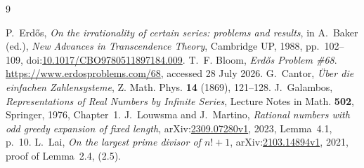 \documentclass[11pt]{article}
\begin{document}
\begin{thebibliography}{9}
\small
\raggedright
\setlength{\itemsep}{0pt}
 P.~Erd\H{o}s, \emph{On the irrationality of certain series:
  problems and results}, in A.~Baker (ed.), \emph{New Advances in Transcendence
  Theory}, Cambridge UP, 1988, pp.~102--109,
  doi:\href{https://doi.org/10.1017/CBO9780511897184.009}
  {10.1017/CBO9780511897184.009}.
 T.~F. Bloom, \emph{Erd\H{o}s Problem \#68}.
  \url{https://www.erdosproblems.com/68}, accessed 28 July 2026.
 G.~Cantor, \emph{\"Uber die einfachen Zahlensysteme},
  Z. Math. Phys. \textbf{14} (1869), 121--128.
 J.~Galambos, \emph{Representations of Real Numbers by
  Infinite Series}, Lecture Notes in Math. \textbf{502}, Springer, 1976,
  Chapter~1.
  J.~Louwsma and J.~Martino,
  \emph{Rational numbers with odd greedy expansion of fixed length},
  arXiv:\href{https://arxiv.org/abs/2309.07280}{2309.07280v1}, 2023,
  Lemma~4.1, p.~10.
  L.~Lai, \emph{On the largest prime divisor of $n!+1$},
  arXiv:\href{https://arxiv.org/abs/2103.14894}{2103.14894v1}, 2021,
  proof of Lemma~2.4, (2.5).
\end{thebibliography}

\companionpapercontext
\end{document}
